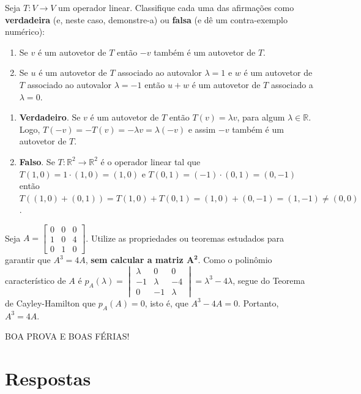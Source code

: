 \documentclass[12pt,a4paper]{article}
\newcommand*\R{\mathbb{R}}
\begin{document}
\begin{ExerciseList}
\Exercise[title={3,0}]
Seja $T: V \to V$ um operador linear. Classifique cada uma das afirmações como \textbf{verdadeira} (e, neste caso, demonstre-a) ou \textbf{falsa} (e dê um contra-exemplo numérico):
\begin{enumerate}
\item Se $v$ é um autovetor de $T$ então $-v$ também é um autovetor de $T$.
\item Se $u$ é um autovetor de $T$ associado ao autovalor $\lambda = 1$ e $w$ é um autovetor de $T$ associado ao autovalor $\lambda = -1$ então $u+w$ é um autovetor de $T$ associado a $\lambda = 0$.
\end{enumerate}
\Answer
\begin{enumerate}
\item \textbf{Verdadeiro}. Se $v$ é um autovetor de $T$ então $T(v) = \lambda v$, para algum $\lambda \in \R$. Logo, $T(-v) = -T(v) = - \lambda v =  \lambda(-v)$ e assim $-v$ também é um autovetor de $T$.
\item \textbf{Falso}. Se $T: \R^2 \to \R^2$ é o operador linear tal que
$
T(1,0) = 1 \cdot (1,0) = (1,0)
$
e
$T(0,1) = (-1) \cdot (0,1) = (0,-1)
$
então $T((1,0) + (0,1)) = T(1,0) + T(0,1) = (1,0) + (0,-1) = (1,-1) \neq (0,0)$.
\end{enumerate}


\Exercise[title={3,0}]
Seja $A = 
\begin{bmatrix}
0 & 0 & 0 \\
1 & 0 & 4 \\
0 & 1 & 0
\end{bmatrix}$. Utilize as propriedades ou teoremas estudados para garantir que $A^3 = 4A$, \textbf{sem calcular a matriz $\mathbf{A^2}$}.
\Answer Como o polinômio característico de $A$ é $ p_A(\lambda) =
\begin{vmatrix}
\lambda & 0 & 0 \\
-1 & \lambda & -4 \\
0 & -1 & \lambda
\end{vmatrix}
=\lambda^3-4\lambda$, segue do Teorema de Cayley-Hamilton que $p_A( A ) = 0$, isto é, que $A^3 - 4A = 0$. Portanto, $A^3 = 4A$.
\end{ExerciseList}

\begin{center}
BOA PROVA E BOAS FÉRIAS!
\end{center}

\newpage
\restoregeometry
\section*{Respostas}
\shipoutAnswer
\end{document}
